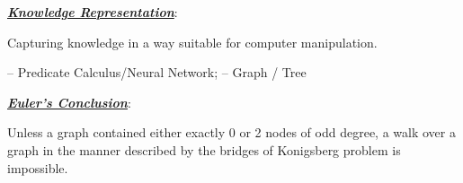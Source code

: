 \documentclass[12pt]{article}
\newcommand{\bulletPoint}[1]{\ul{\textit{\textbf{#1}}}}
\begin{document}
\singlespacing


\begin{multicols*}{2}

\scriptsize

\raggedright

\bulletPoint{Knowledge Representation}:

Capturing knowledge in a way suitable for computer manipulation.

– Predicate Calculus/Neural Network;   
– Graph / Tree






\bulletPoint{Euler's Conclusion}:

Unless a graph contained either exactly 0 or 2 nodes of odd degree, a walk over a graph in the manner described by the bridges of Konigsberg problem is impossible. 














\end{multicols*}
\end{document}
